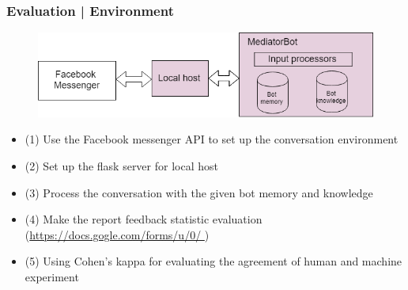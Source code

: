 \documentclass{beamer}
\begin{document}
\begin{frame}
\frametitle{Evaluation | Environment}
\begin{figure}
	\includegraphics[width=.8\textwidth]{ue1.png}
\end{figure}
\begin{itemize}
	\item {\scriptsize (1) Use the Facebook messenger API to set up the conversation environment}
	\item {\scriptsize (2) Set up the flask server for local host }
	\item {\scriptsize (3) Process the conversation with the given bot memory and knowledge }
	\item {\scriptsize (4) Make the report feedback statistic evaluation (\url{https://docs.gogle.com/forms/u/0/ })}
	\item {\scriptsize (5) Using Cohen's kappa for evaluating the agreement of human and machine experiment }
\end{itemize}


\end{frame}
\end{document}
